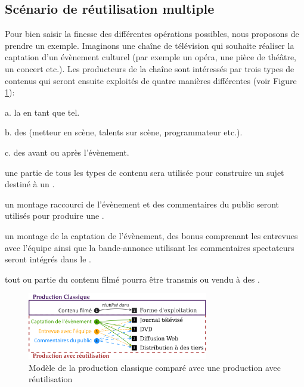 \subsection{Scénario de réutilisation multiple}\label{sec:ex-reuse}
Pour bien saisir la finesse des différentes opérations possibles, nous proposons de prendre un exemple.
Imaginons une chaîne de télévision qui souhaite réaliser la captation d'un évènement culturel (par exemple un opéra, une pièce de théâtre, un concert etc.). 
Les producteurs de la chaîne sont intéressés par trois types de contenus qui seront ensuite exploités de quatre manières différentes (voir Figure \ref{img:intro:reuse}):
\begin{listenum}
	\item[a.] la  en tant que tel.
	\item[b.] des  (metteur en scène, talents sur scène, programmateur etc.). 
	\item[c.] des  avant ou après l'évènement.\\

	\item une partie de tous les types de contenu sera utilisée pour construire un sujet destiné à un . 
	\item un montage raccourci de l'évènement et des commentaires du public seront utilisés pour produire une .
	\item un montage de la captation de l'évènement, des bonus comprenant les entrevues avec l'équipe ainsi que la bande-annonce utilisant les commentaires spectateurs seront intégrés dans le .	 
	\item tout ou partie du contenu filmé pourra être transmis ou vendu à des . 
\end{listenum}

\begin{figure}[ht!]
\centering
\includegraphics[width=0.7\textwidth]{images/UC-Tahnhauser-v1fr.png}
\caption{Modèle de la production classique comparé avec une production avec réutilisation}
\label{img:intro:reuse}
\end{figure}

